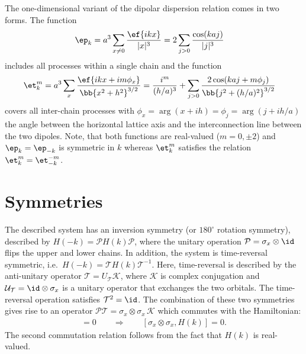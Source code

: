 The one-dimensional variant of the dipolar dispersion relation comes in two forms. The function
\begin{align}
    \ep_k &= a^3 \sum_{x\ne 0} \frac{\ef{i k x}}{|x|^3} = 2 \sum_{j>0} \frac{\cos(k a j)}{|j|^3}
\end{align}
includes all processes within a single chain and the function
\begin{align}
    \et^m_k &= a^3 \sum_{x} \frac{\ef{i k x + i m \phi_x}}{\bb{x^2 + h^2}^{3/2}}
    = \frac{i^m}{(h/a)^3} + \sum_{j>0} \frac{2\cos(ka j+m\phi_j)}{\bb{j^2+(h/a)^2}^{3/2}}
\end{align}
covers all inter-chain processes with $\phi_x = \arg(x+ i h)=\phi_j=\arg(j+ i h/a)$ the angle between the horizontal lattice axis and the interconnection line between the two dipoles.
Note, that both functions are real-valued ($m = 0, \pm 2$) and $\ep_k=\ep_{-k}$ is symmetric in $k$ whereas $\et^m_k$ satisfies the relation $\et^m_k=\et^{-m}_{-k}$.

\section{Symmetries}
The described system has an inversion symmetry (or $180^\circ$ rotation symmetry), described by $H(-k) = \mathcal{P} H(k) \mathcal{P}$, where the unitary operation $\mathcal{P} = \sigma_x \otimes \id$ flips the upper and lower chains.
In addition, the system is time-reversal symmetric, i.e.~$H(-k)=\mathcal{T} H(k) \mathcal{T}^{-1}$.
Here, time-reversal is described by the anti-unitary operator $\mathcal{T}=U_\mathcal{T} \mathcal{K}$, where $\mathcal{K}$ is complex conjugation and $\mathcal{U}_\mathcal{T} = \id \otimes \sigma_x$ is a unitary operator that exchanges the two orbitals.
The time-reversal operation satisfies $\mathcal{T}^2 = \id$.
The combination of these two symmetries gives rise to an operator $\mathcal{P}\mathcal{T} = \sigma_x \otimes \sigma_x \, \mathcal{K}$ which commutes with the Hamiltonian:
\begin{align}
    [\mathcal{P}\mathcal{T}, H(k)] = 0\qquad \Rightarrow \qquad [\sigma_x \otimes \sigma_x, H(k)]= 0.
\end{align}
The second commutation relation follows from the fact that $H(k)$ is real-valued.


